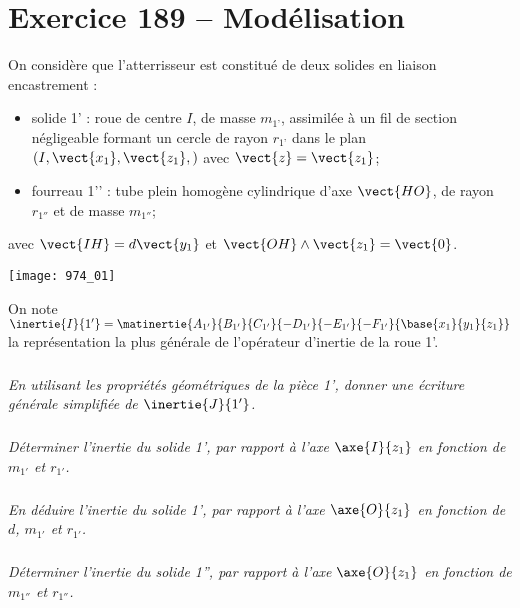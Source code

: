 \section*{Exercice 189 -- Modélisation}
\setcounter{exo}{0}
On considère que l’atterrisseur est constitué de deux solides en liaison encastrement :
\begin{itemize}
\item solide 1’ : roue de centre $I$, de masse $m_{1’}$, assimilée à un fil de section négligeable formant un cercle de rayon $r_{1’}$ dans le plan $\left(I,\vect{x_1},\vect{z_1}, \right)$ avec $\vect{z}=\vect{z_1}$;
\item fourreau 1’’ : tube plein homogène cylindrique d’axe $\vect{HO}$, de rayon $r_{1''}$ et de masse $m_{1''}$;
 \end{itemize}
avec $\vect{IH}=d\vect{y_1}$ et $\vect{OH}\wedge \vect{z_1}=\vect{0}$.

\begin{center}
\texttt{[image: 974\_01]}%
\end{center}


On note $\inertie{I}{1'}=\matinertie{A_{1'}}{B_{1'}}{C_{1'}}{-D_{1'}}{-E_{1'}}{-F_{1'}}{\base{x_1}{y_1}{z_1}}$ 
la représentation la plus générale de l’opérateur d’inertie de la roue 1'.


\subparagraph{}
\textit{En utilisant les propriétés géométriques de la pièce 1’, donner une écriture générale simplifiée de $\inertie{J}{1'}$.}
\ifprof
\begin{corrige}
\end{corrige}
\else
\fi

\subparagraph{}
\textit{Déterminer l’inertie du solide 1’, par rapport à l’axe $\axe{I}{z_1}$ en fonction de $m_{1'}$ et $r_{1'}$.}
\ifprof
\begin{corrige}
\end{corrige}
\else
\fi

\subparagraph{}
\textit{En déduire l’inertie du solide 1’, par rapport à l’axe $\axe{O}{z_1}$ en fonction de $d$, $m_{1'}$ et $r_{1'}$.}
\ifprof
\begin{corrige}
\end{corrige}
\else
\fi

\subparagraph{}
\textit{Déterminer l’inertie du solide 1'', par rapport à l’axe $\axe{O}{z_1}$ en fonction de $m_{1''}$ et $r_{1''}$.}
\ifprof
\begin{corrige}
\end{corrige}
\else
\fi


